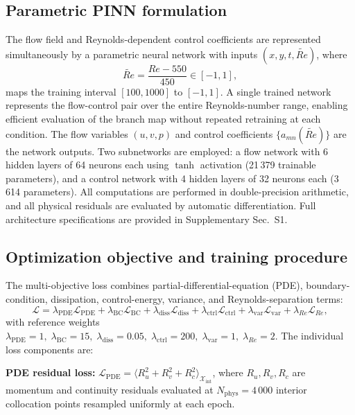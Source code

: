 \documentclass[a4paper,11pt]{article}
\begin{document}
\subsection{Parametric PINN formulation}

The flow field and Reynolds-dependent control coefficients are represented
simultaneously by a parametric neural network with inputs \((x,y,t,\widetilde{Re})\),
where
\begin{equation}
\widetilde{Re}=\frac{Re-550}{450}\in[-1,1],
\label{eq:re_norm}
\end{equation}
maps the training interval \([100,1000]\) to \([-1,1]\). A single trained network
represents the flow-control pair over the entire Reynolds-number range, enabling
efficient evaluation of the branch map without repeated retraining at each condition.
The flow variables \((u,v,p)\) and control coefficients \(\{a_{mn}(\widetilde{Re})\}\)
are the network outputs. Two subnetworks are employed: a flow network with 6 hidden
layers of 64 neurons each using \(\tanh\) activation (21\,379 trainable parameters),
and a control network with 4 hidden layers of 32 neurons each (3\,614 parameters).
All computations are performed in double-precision arithmetic, and all physical
residuals are evaluated by automatic differentiation. Full architecture
specifications are provided in Supplementary Sec.~S1.

\subsection{Optimization objective and training procedure}

The multi-objective loss combines partial-differential-equation (PDE),
boundary-condition, dissipation, control-energy, variance, and
Reynolds-separation terms:
\begin{equation}
\mathcal{L}=\lambda_{\mathrm{PDE}}\mathcal{L}_{\mathrm{PDE}}
+\lambda_{\mathrm{BC}}\mathcal{L}_{\mathrm{BC}}
+\lambda_{\mathrm{diss}}\mathcal{L}_{\mathrm{diss}}
+\lambda_{\mathrm{ctrl}}\mathcal{L}_{\mathrm{ctrl}}
+\lambda_{\mathrm{var}}\mathcal{L}_{\mathrm{var}}
+\lambda_{Re}\mathcal{L}_{Re},
\label{eq:total_loss}
\end{equation}
with reference weights
\(\lambda_{\mathrm{PDE}}=1,\; \lambda_{\mathrm{BC}}=15,\;
\lambda_{\mathrm{diss}}=0.05,\; \lambda_{\mathrm{ctrl}}=200,\;
\lambda_{\mathrm{var}}=1,\; \lambda_{Re}=2\).
The individual loss components are:

\textbf{PDE residual loss:}
\(\mathcal{L}_{\mathrm{PDE}}=\langle R_u^2+R_v^2+R_c^2\rangle_{\mathcal{X}_{\mathrm{int}}}\),
where \(R_u,R_v,R_c\) are momentum and continuity residuals evaluated at
\(N_{\mathrm{phys}}=4\,000\) interior collocation points resampled uniformly at each epoch.
\end{document}
